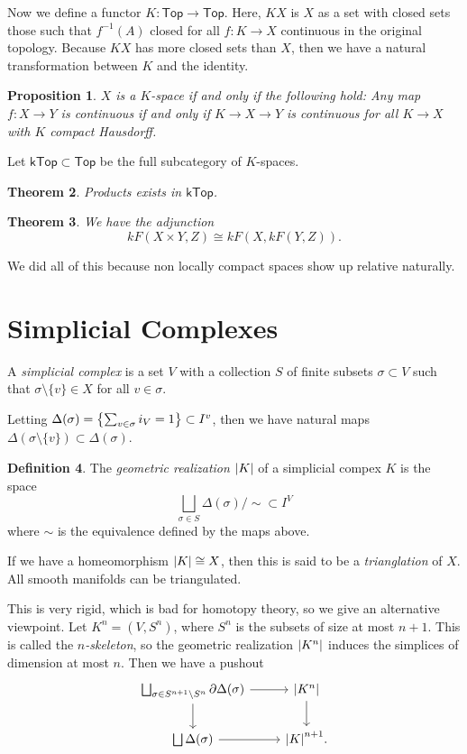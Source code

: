 \documentclass[leqno, openany]{memoir}
\newtheorem{thm}{Theorem}[section]
\newtheorem{prop}[thm]{Proposition}
\theoremstyle{definition}
\newtheorem{defn}[thm]{Definition}
\theoremstyle{remark}
\theoremstyle{plain}
\theoremstyle{definition}
\theoremstyle{remark}
\newcommand{\ms}[1]{\mathsf{#1}}
\begin{document}
Now we define a functor $K \colon \ms{Top} \to \ms{Top}$. Here, $KX$ is $X$ as a set with closed sets those such that $f^{-1}(A)$ closed for all $f \colon K \to X$ continuous in the original topology. Because $KX$ has more closed sets than $X$, then we have a natural transformation between $K$ and the identity.

\begin{prop}
    $X$ is a $K$-space if and only if the following hold: Any map $f \colon X \to Y$ is continuous if and only if $K \to X \to Y$ is continuous for all $K \to X$ with $K$ compact Hausdorff.
\end{prop}

Let $\ms{kTop} \subset \ms{Top}$ be the full subcategory of $K$-spaces.

\begin{thm}
    Products exists in $\ms{kTop}$.
\end{thm}

\begin{thm}
    We have the adjunction
    \[ kF(X \times Y, Z) \cong kF(X, kF(Y, Z)). \]
\end{thm}

We did all of this because non locally compact spaces show up relative naturally. 

\section{Simplicial Complexes}%
\label{sec:simplicial_complexes}

A \textit{simplicial complex} is a set $V$ with a collection $S$ of finite subsets $\sigma \subset V$ such that $\sigma \setminus \{v \} \in X$ for all $v \in \sigma$.

Letting $\Delta(\sigma) = \qty{\sum_{v \in \sigma} i_V = 1} \subset I^{v}$, then we have natural maps $\Delta(\sigma \setminus \{v\}) \subset \Delta(\sigma)$.

\begin{defn}
    The \textit{geometric realization} $\abs{K}$ of a simplicial compex $K$ is the space
    \[ \bigsqcup_{\sigma \in S} \Delta(\sigma) / \sim \subset I^V \]
    where $\sim$ is the equivalence defined by the maps above.
\end{defn}

If we have a homeomorphism $\abs{K} \cong X$, then this is said to be a \textit{trianglation} of $X$. All smooth manifolds can be triangulated.

This is very rigid, which is bad for homotopy theory, so we give an alternative viewpoint. Let $K^n = (V, S^n)$, where $S^n$ is the subsets of size at most $n+1$. This is called the \textit{$n$-skeleton}, so the geometric realization $\abs{K^n}$ induces the simplices of dimension at most $n$. Then we have a pushout
\begin{equation*}
\begin{tikzcd}
    \bigsqcup_{\sigma \in S^{n+1} \setminus S^n} \partial \Delta(\sigma) \arrow{r} \arrow{d} & \abs{K^n} \arrow{d} \\
    \bigsqcup \Delta(\sigma) \arrow{r} & \abs{K}^{n+1}.
\end{tikzcd}
\end{equation*}
\end{document}
